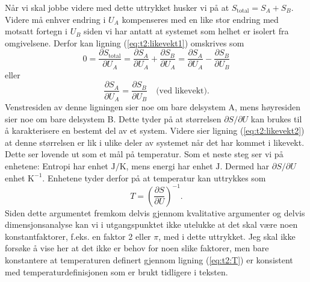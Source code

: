 Når vi skal jobbe videre med dette uttrykket husker vi på at $S_\text{total} = S_A + S_B$. Videre må enhver endring i $U_A$ kompenseres med en like stor endring med motsatt fortegn i $U_B$ siden vi har antatt at systemet som helhet er isolert fra omgivelsene. Derfor kan ligning (\ref{eq:t2:likevekt1}) omskrives som
\begin{displaymath}
	0 = \frac{\partial S_\text{total}}{\partial U_A} = \frac{\partial S_A}{\partial U_A} + \frac{\partial S_B}{\partial U_A}
	 = \frac{\partial S_A}{\partial U_A} - \frac{\partial S_B}{\partial U_B}
\end{displaymath}
eller
\begin{displaymath}
	\frac{\partial S_A}{\partial U_A} = \frac{\partial S_B}{\partial U_B} \quad \text{(ved likevekt)}.
	\label{eq:t2:likevekt2}
\end{displaymath}
Venstresiden av denne ligningen sier noe om bare delsystem A, mens høyre\-siden sier noe om bare delsystem B. Dette tyder på at størrelsen $\partial S/\partial U$ kan brukes til å karakterisere en bestemt del av et system. Videre sier ligning (\ref{eq:t2:likevekt2}) at denne størrelsen er lik i ulike deler av systemet når det har kommet i likevekt. Dette ser lovende ut som et mål på temperatur. Som et neste steg ser vi på enhetene: Entropi har enhet $\mathrm{J/K}$, mens energi har enhet $\mathrm{J}$. Dermed har $\partial S/\partial U$ enhet $\mathrm{K^{-1}}$. Enhetene tyder derfor på at temperatur kan uttrykkes som 
\begin{displaymath}
	T = \left(\frac{\partial S}{\partial U}\right)^{-1}.
	\label{eq:t2:T}
\end{displaymath}
Siden dette argumentet fremkom delvis gjennom kvalitative argumenter og delvis dimensjonsanalyse kan vi i utgangspunktet ikke utelukke at det skal være noen konstantfaktorer, f.eks. en faktor 2 eller $\pi$, med i dette uttrykket. Jeg skal ikke forsøke å vise her at det ikke er behov for noen slike faktorer, men bare konstantere at temperaturen definert gjennom ligning (\ref{eq:t2:T}) er konsistent med temperaturdefinisjonen som er brukt tidligere i teksten.